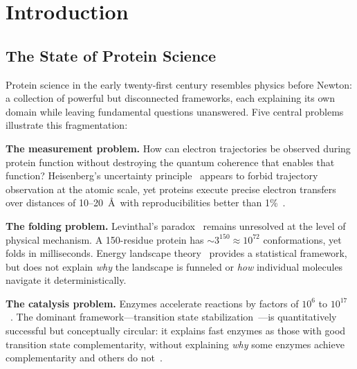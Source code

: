 \documentclass[aps,prx,superscriptaddress,twocolumn,10pt,a4paper,longbibliography,preprint]{revtex4-2}
\theoremstyle{definition}
\theoremstyle{remark}
\begin{document}

\section{Introduction}
\label{sec:intro}

\subsection{The State of Protein Science}

Protein science in the early twenty-first century resembles physics before Newton: a collection of powerful but disconnected frameworks, each explaining its own domain while leaving fundamental questions unanswered. Five central problems illustrate this fragmentation:

\textbf{The measurement problem.} How can electron trajectories be observed during protein function without destroying the quantum coherence that enables that function? Heisenberg's uncertainty principle~\cite{Heisenberg1927} appears to forbid trajectory observation at the atomic scale, yet proteins execute precise electron transfers over distances of 10--20~\AA\ with reproducibilities better than 1\%~\cite{Gray2005, Marcus1993}.

\textbf{The folding problem.} Levinthal's paradox~\cite{Levinthal1969} remains unresolved at the level of physical mechanism. A 150-residue protein has $\sim 3^{150} \approx 10^{72}$ conformations, yet folds in milliseconds. Energy landscape theory~\cite{Bryngelson1995, Onuchic1997, Dill2012} provides a statistical framework, but does not explain \emph{why} the landscape is funneled or \emph{how} individual molecules navigate it deterministically.

\textbf{The catalysis problem.} Enzymes accelerate reactions by factors of $10^6$ to $10^{17}$~\cite{Wolfenden2001}. The dominant framework---transition state stabilization~\cite{Pauling1946, Fersht1999}---is quantitatively successful but conceptually circular: it explains fast enzymes as those with good transition state complementarity, without explaining \emph{why} some enzymes achieve complementarity and others do not~\cite{Warshel1998, Kamerlin2010}.
\end{document}
